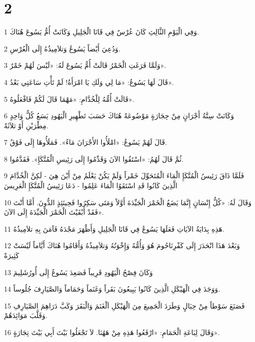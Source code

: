 \chapter{2}

\par 1 وَفِي الْيَوْمِ الثَّالِثِ كَانَ عُرْسٌ فِي قَانَا الْجَلِيلِ وَكَانَتْ أُمُّ يَسُوعَ هُنَاكَ.
\par 2 وَدُعِيَ أَيْضاً يَسُوعُ وَتلاَمِيذُهُ إِلَى الْعُرْسِ.
\par 3 وَلَمَّا فَرَغَتِ الْخَمْرُ قَالَتْ أُمُّ يَسُوعَ لَهُ: «لَيْسَ لَهُمْ خَمْرٌ».
\par 4 قَالَ لَهَا يَسُوعُ: «مَا لِي وَلَكِ يَا امْرَأَةُ! لَمْ تَأْتِ سَاعَتِي بَعْدُ».
\par 5 قَالَتْ أُمُّهُ لِلْخُدَّامِ: «مَهْمَا قَالَ لَكُمْ فَافْعَلُوهُ».
\par 6 وَكَانَتْ سِتَّةُ أَجْرَانٍ مِنْ حِجَارَةٍ مَوْضُوعَةً هُنَاكَ حَسَبَ تَطْهِيرِ الْيَهُودِ يَسَعُ كُلُّ وَاحِدٍ مِطْرَيْنِ أَوْ ثلاَثَةً.
\par 7 قَالَ لَهُمْ يَسُوعُ: «امْلَأُوا الأَجْرَانَ مَاءً». فَمَلَأُوهَا إِلَى فَوْقُ.
\par 8 ثُمَّ قَالَ لَهُمُ: «اسْتَقُوا الآنَ وَقَدِّمُوا إِلَى رَئِيسِ الْمُتَّكَإِ». فَقَدَّمُوا.
\par 9 فَلَمَّا ذَاقَ رَئِيسُ الْمُتَّكَإِ الْمَاءَ الْمُتَحَوِّلَ خَمْراً وَلَمْ يَكُنْ يَعْلَمُ مِنْ أَيْنَ هِيَ - لَكِنَّ الْخُدَّامَ الَّذِينَ كَانُوا قَدِ اسْتَقَوُا الْمَاءَ عَلِمُوا - دَعَا رَئِيسُ الْمُتَّكَإِ الْعَرِيسَ
\par 10 وَقَالَ لَهُ: «كُلُّ إِنْسَانٍ إِنَّمَا يَضَعُ الْخَمْرَ الْجَيِّدَةَ أَوَّلاً وَمَتَى سَكِرُوا فَحِينَئِذٍ الدُّونَ. أَمَّا أَنْتَ فَقَدْ أَبْقَيْتَ الْخَمْرَ الْجَيِّدَةَ إِلَى الآنَ».
\par 11 هَذِهِ بِدَايَةُ الآيَاتِ فَعَلَهَا يَسُوعُ فِي قَانَا الْجَلِيلِ وَأَظْهَرَ مَجْدَهُ فَآمَنَ بِهِ تلاَمِيذُهُ.
\par 12 وَبَعْدَ هَذَا انْحَدَرَ إِلَى كَفْرِنَاحُومَ هُوَ وَأُمُّهُ وَإِخْوَتُهُ وَتلاَمِيذُهُ وَأَقَامُوا هُنَاكَ أَيَّاماً لَيْسَتْ كَثِيرَةً
\par 13 وَكَانَ فِصْحُ الْيَهُودِ قَرِيباً فَصَعِدَ يَسُوعُ إِلَى أُورُشَلِيمَ
\par 14 وَوَجَدَ فِي الْهَيْكَلِ الَّذِينَ كَانُوا يَبِيعُونَ بَقَراً وَغَنَماً وَحَمَاماً وَالصَّيَارِفَ جُلُوساً.
\par 15 فَصَنَعَ سَوْطاً مِنْ حِبَالٍ وَطَرَدَ الْجَمِيعَ مِنَ الْهَيْكَلِ اَلْغَنَمَ وَالْبَقَرَ وَكَبَّ دَرَاهِمَ الصَّيَارِفِ وَقَلَّبَ مَوَائِدَهُمْ.
\par 16 وَقَالَ لِبَاعَةِ الْحَمَامِ: «ارْفَعُوا هَذِهِ مِنْ هَهُنَا. لاَ تَجْعَلُوا بَيْتَ أَبِي بَيْتَ تِجَارَةٍ».
